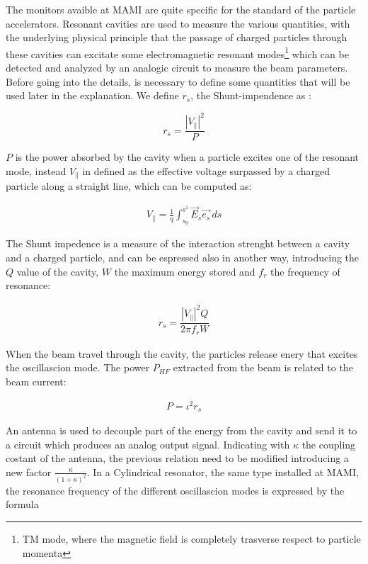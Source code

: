 The monitors avaible at MAMI are quite specific for the standard of the particle accelerators. Resonant cavities are used to measure the various quantities, with the underlying physical principle that the passage of charged particles through these cavities can excitate some electromagnetic resonant modes\footnote{TM mode, where the magnetic field is completely trasverse respect to particle momenta} which can be detected and analyzed by an analogic circuit to measure the beam parameters.
Before going into the details, is necessary to define some quantities that will be used later in the explanation. We define $r_{s}$, the Shunt-impendence as :

\begin{equation}
r_{s} = \frac{|V_{\|}|^{2}}{P}
\end{equation}

$P$ is the power absorbed by the cavity when a particle excites one of the resonant mode, instead $V_{\|}$ in defined as the effective voltage surpassed by a charged particle along a straight line, which can be computed as:

\begin{align*}
V_{\|} = \frac{1}{q}  \int_{s_{0}}^{s^{1}} \vec{E}_{s} \vec{e_{s}} \,ds
\end{align*}

The Shunt impedence is a measure of the interaction strenght between a cavity and a charged particle, and can be espressed also in another way, introducing the $Q$ value of the cavity, $W$ the maximum energy stored and $f_{r}$ the frequency of resonance:

\begin{align*}
r_{s} = \dfrac{|V_{\|}|^{2} Q}{2 \pi f_{r} W}
\end{align*}

When the beam travel through the cavity, the particles release enery that excites the oscillascion mode. The power $P_{HF}$ extracted from the beam is related to the beam current: 

\begin{align*}
P = \iota^{2} r_{s}
\end{align*}

An antenna is used to decouple part of the energy from the cavity and send it to a circuit which produces an analog output signal. Indicating with $\kappa$ the coupling costant of the antenna, the previous relation need to be modified introducing a new factor $ \frac{\kappa}{(1 + \kappa)^2}$. In a Cylindrical resonator, the same type installed at MAMI, the resonance frequency of the different oscillascion modes is expressed by the formula 

